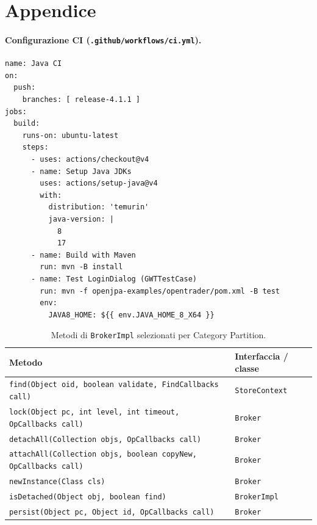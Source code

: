 \section*{Appendice}

\paragraph*{Configurazione CI (\texttt{.github/workflows/ci.yml}).}
\label{cmd:ci-config}
\begin{lstlisting}
name: Java CI
on:
  push:
    branches: [ release-4.1.1 ]
jobs:
  build:
    runs-on: ubuntu-latest
    steps:
      - uses: actions/checkout@v4
      - name: Setup Java JDKs
        uses: actions/setup-java@v4
        with:
          distribution: 'temurin'
          java-version: |
            8
            17
      - name: Build with Maven
        run: mvn -B install
      - name: Test LoginDialog (GWTTestCase)
        run: mvn -f openjpa-examples/opentrader/pom.xml -B test
        env:
          JAVA8_HOME: ${{ env.JAVA_HOME_8_X64 }}
\end{lstlisting}

\begin{table}[H]
\centering
\begin{tabularx}{\textwidth}{X l}
\toprule
Metodo & Interfaccia / classe \\
\midrule
\texttt{find(Object oid, boolean validate, FindCallbacks call)} & \texttt{StoreContext} \\
\texttt{lock(Object pc, int level, int timeout, OpCallbacks call)} & \texttt{Broker} \\
\texttt{detachAll(Collection objs, OpCallbacks call)} & \texttt{Broker} \\
\texttt{attachAll(Collection objs, boolean copyNew, OpCallbacks call)} & \texttt{Broker} \\
\texttt{newInstance(Class cls)} & \texttt{Broker} \\
\texttt{isDetached(Object obj, boolean find)} & \texttt{BrokerImpl} \\
\texttt{persist(Object pc, Object id, OpCallbacks call)} & \texttt{Broker} \\
\bottomrule
\end{tabularx}
\caption{Metodi di \texttt{BrokerImpl} selezionati per Category Partition.}
\label{tab:brokerimpl-metodi}
\end{table}

